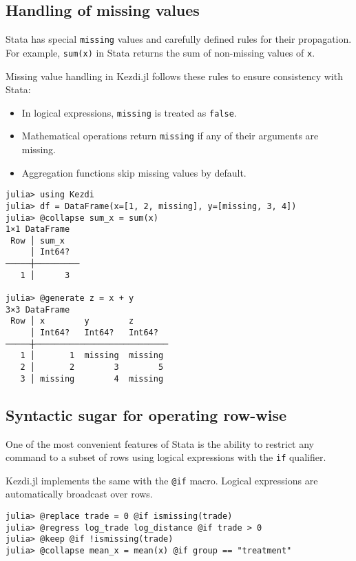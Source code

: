 \documentclass{juliacon}
\begin{document}
\subsection{Handling of missing values}

Stata has special \texttt{missing} values and carefully defined rules for their propagation. For example, \texttt{sum(x)} in Stata returns the sum of non-missing values of \texttt{x}.

Missing value handling in Kezdi.jl follows these rules to ensure consistency with Stata:

\begin{itemize}
    \item In logical expressions, \texttt{missing} is treated as \texttt{false}. 
    \item Mathematical operations return \texttt{missing} if any of their arguments are missing.
    \item Aggregation functions skip missing values by default.
\end{itemize}

\begin{verbatim}
julia> using Kezdi
julia> df = DataFrame(x=[1, 2, missing], y=[missing, 3, 4])
julia> @collapse sum_x = sum(x)
1×1 DataFrame
 Row │ sum_x   
     │ Int64?  
─────┼─────────
   1 │      3

julia> @generate z = x + y
3×3 DataFrame
 Row │ x        y        z
     │ Int64?   Int64?   Int64?
─────┼───────────────────────────
   1 │       1  missing  missing
   2 │       2        3        5
   3 │ missing        4  missing
\end{verbatim}

\subsection{Syntactic sugar for operating row-wise}

One of the most convenient features of Stata is the ability to restrict any command to a subset of rows using logical expressions with the \texttt{if} qualifier.

Kezdi.jl implements the same with the \texttt{@if} macro. Logical expressions are automatically broadcast over rows.

\begin{verbatim}
julia> @replace trade = 0 @if ismissing(trade)
julia> @regress log_trade log_distance @if trade > 0
julia> @keep @if !ismissing(trade) 
julia> @collapse mean_x = mean(x) @if group == "treatment"
\end{verbatim}
\end{document}
